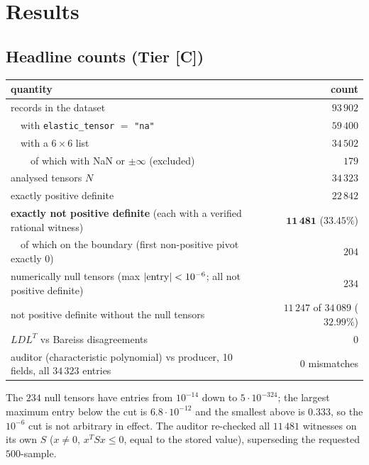 \documentclass[10pt]{article}
\newcommand{\tier}[1]{\textsf{[#1]}}
\newcommand{\tC}{\tier{C}}
\begin{document}
\section{Results}\label{sec:results}
\subsection{Headline counts (Tier \tC)}
\begin{center}\small\begin{tabular}{lr}\toprule
quantity & count\\\midrule
records in the dataset & $93\,902$\\
\ \ with \texttt{elastic\_tensor} $=$ \texttt{"na"} & $59\,400$\\
\ \ with a $6\times6$ list & $34\,502$\\
\ \ \ \ of which with NaN or $\pm\infty$ (excluded) & $179$\\
analysed tensors $N$ & $34\,323$\\
exactly positive definite & $22\,842$\\
\textbf{exactly not positive definite} (each with a verified rational witness) & $\mathbf{11\,481}$ ($33.45\%$)\\
\ \ of which on the boundary (first non-positive pivot exactly $0$) & $204$\\
numerically null tensors (max $|{\rm entry}|<10^{-6}$; all not positive definite) & $234$\\
not positive definite without the null tensors & $11\,247$ of $34\,089$ ($32.99\%$)\\
$LDL^T$ vs Bareiss disagreements & $0$\\
auditor (characteristic polynomial) vs producer, 10 fields, all $34\,323$ entries & $0$ mismatches\\\bottomrule
\end{tabular}\end{center}
The $234$ null tensors have entries from $10^{-14}$ down to $5\cdot10^{-324}$; the largest maximum entry below the cut is $6.8\cdot10^{-12}$ and the smallest above is $0.333$, so the $10^{-6}$ cut is not arbitrary in effect. The auditor re-checked all $11\,481$ witnesses on its own $S$ ($x\ne0$, $x^TSx\le0$, equal to the stored value), superseding the requested $500$-sample.
\end{document}
